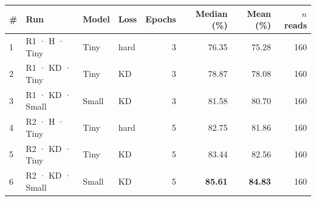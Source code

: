 \begin{tabular}{llllrrrr}
\toprule
\# & Run & Model & Loss & Epochs & Median (\%) & Mean (\%) & $n$ reads \\
\midrule
1 & R1 · H · Tiny & Tiny & hard & 3 & 76.35 & 75.28 & 160 \\
2 & R1 · KD · Tiny & Tiny & KD & 3 & 78.87 & 78.08 & 160 \\
3 & R1 · KD · Small & Small & KD & 3 & 81.58 & 80.70 & 160 \\
4 & R2 · H · Tiny & Tiny & hard & 5 & 82.75 & 81.86 & 160 \\
5 & R2 · KD · Tiny & Tiny & KD & 5 & 83.44 & 82.56 & 160 \\
6 & R2 · KD · Small & Small & KD & 5 & \textbf{85.61} & \textbf{84.83} & 160 \\
\bottomrule
\end{tabular}
